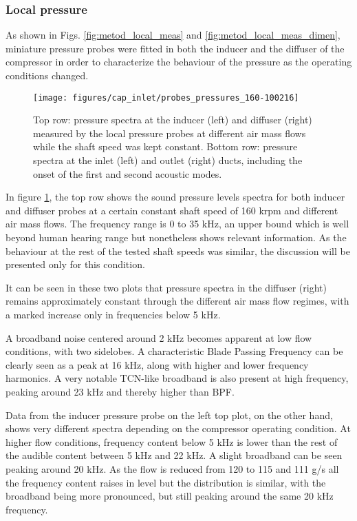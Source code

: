 \subsubsection{Local pressure}

As shown in Figs. \ref{fig:metod_local_meas} and \ref{fig:metod_local_meas_dimen}, miniature pressure probes were fitted in both the inducer and the diffuser of the compressor in order to characterize the behaviour of the pressure as the operating conditions changed.

\begin{figure}[thb!]
\hspace{-0.08\textwidth}
\texttt{[image: figures/cap\_inlet/probes\_pressures\_160-100216]}
\caption[Pressure spectra from probes and duct sensors]{Top row: pressure spectra at the inducer (left) and diffuser (right) measured by the local pressure probes at different air mass flows while the shaft speed was kept constant. Bottom row: pressure spectra at the inlet (left) and outlet (right) ducts, including the onset of the first and second acoustic modes.}
\label{fig:probes_all}
\end{figure}

In figure \ref{fig:probes_all}, the top row shows the sound pressure levels spectra for both inducer and diffuser probes at a certain constant shaft speed of 160 krpm and different air mass flows. The frequency range is 0 to 35 kHz, an upper bound which is well beyond human hearing range but nonetheless shows relevant information. As the behaviour at the rest of the tested shaft speeds was similar, the discussion will be presented only for this condition.

It can be seen in these two plots that pressure spectra in the diffuser (right) remains approximately constant through the different air mass flow regimes, with a marked increase only in frequencies below 5 kHz.

A broadband noise centered around 2 kHz becomes apparent at low flow conditions, with two sidelobes. A characteristic Blade Passing Frequency can be clearly seen as a peak at 16 kHz, along with higher and lower frequency harmonics. A very notable TCN-like broadband is also present at high frequency, peaking around 23 kHz and thereby higher than BPF. 

Data from the inducer pressure probe on the left top plot, on the other hand, shows very different spectra depending on the compressor operating condition. At higher flow conditions, frequency content below 5 kHz is lower than the rest of the audible content between 5 kHz and 22 kHz. A slight broadband can be seen peaking around 20 kHz. As the flow is reduced from 120 to 115 and 111 g/s all the frequency content raises in level but the distribution is similar, with the broadband being more pronounced, but still peaking around the same 20 kHz frequency.

